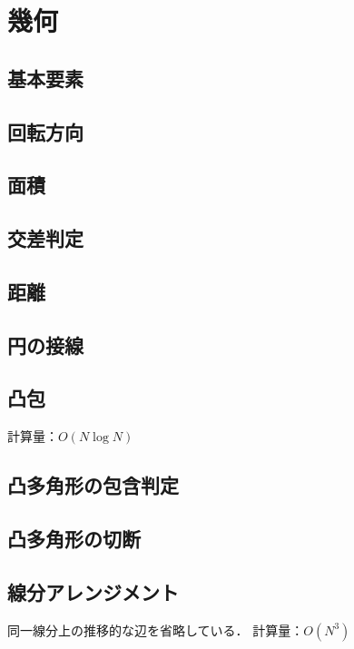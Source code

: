\documentclass[landscape,twocolumn,9pt]{jsarticle}
\begin{document}
\section{幾何}%
\subsection{基本要素}


\subsection{回転方向}


\subsection{面積}


\subsection{交差判定}


\subsection{距離}


\subsection{円の接線}


\subsection{凸包}
計算量：$O(N\log N)$


\subsection{凸多角形の包含判定}


\subsection{凸多角形の切断}


\subsection{線分アレンジメント}
同一線分上の推移的な辺を省略している．
計算量：$O(N^3)$

\end{document}
